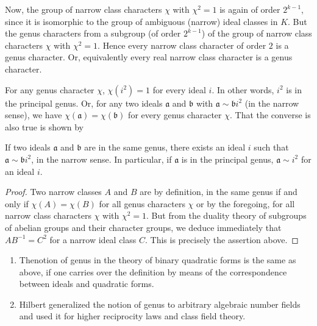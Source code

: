 \begin{enumerate}
Now, the group of narrow class characters $\chi$ with $\chi^{2}=1$ is
again of order $2^{k-1}$, since it is isomorphic to the group of
ambiguous (narrow) ideal classes in $K$. But the genus characters from
a subgroup (of order $2^{k-1}$) of the group of narrow class
characters $\chi$ with $\chi^{2}=1$. Hence every narrow class
character of order $2$ is a genus character. Or, equivalently every
real narrow class character is a genus character.

For any genus character $\chi$, $\chi(i^{2})=1$ for every ideal
$i$. In other words, $i^{2}$ is in the principal genus. Or, for any
two ideals $\mathfrak{a}$ and $\mathfrak{b}$ with $\mathfrak{a}\sim
\mathfrak{b}i^{2}$ (in the narrow sense), we have
$\chi(\mathfrak{a})=\chi(\mathfrak{b})$ for every genus character
$\chi$. That the converse is also true is shown by
\end{enumerate}

\begin{thm}[{\bf Gauss}]\label{thm5}
If two ideals $\mathfrak{a}$ and $\mathfrak{b}$ are in the same genus,
there exists an ideal $i$ such that $\mathfrak{a}\sim
\mathfrak{b}i^{2}$, in the narrow sense. In particular, if
$\mathfrak{a}$ is in the principal genus, $\mathfrak{a}\sim i^{2}$ for
an ideal $i$.
\end{thm}

\begin{proof}
Two narrow classes $A$ and $B$ are by definition, in the same genus if
and only if $\chi(A)=\chi(B)$ for all genus characters $\chi$ or by
the foregoing, for all narrow class characters $\chi$ with
$\chi^{2}=1$. But from the duality theory of subgroups of abelian
groups and their character groups, we deduce immediately that
$AB^{-1}=C^{2}$ for a narrow ideal class $C$. This is precisely the
assertion above.
\end{proof}

\begin{remarks*}
\begin{enumerate}
\renewcommand{\labelenumi}{(\theenumi)}
\item The\pageoriginale notion of genus in the theory of binary
  quadratic forms is the same as above, if one carries over the
  definition by means of the correspondence between ideals and
  quadratic forms.

\item Hilbert generalized the notion of genus to arbitrary algebraic
  number fields and used it for higher reciprocity laws and class
  field theory.
\end{enumerate}
\end{remarks*}

